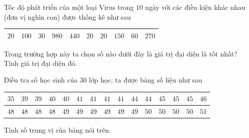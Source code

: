 \begin{bt}%
	 Tốc độ phát triển của một loại Virus trong $10$ ngày với các điều kiện khác nhau (đơn vị nghìn con) được thống kê như sau
	\begin{center}
		\begin{tabular}{|l|l|l|l|l|l|l|l|l|l|}
			 \hline $20$&$100$&$30$&$980$&$440$&$20$&$20$&$150$&$60$&$270$\\
			 \hline
		\end{tabular}
	\end{center}
	Trong  trường hợp này ta chọn số nào dưới đây là giá trị đại diện là tốt nhất? Tính giá trị đại diện đó.
\end{bt}

\begin{bt}%
	 Điều tra số học sinh của $30$ lớp học, ta được bảng số liệu như sau
	\begin{center}
		\begin{tabular}{|l|l|l|l|l|l|l|l|l|l|l|l|l|l|l|}
			 \hline $35$&$39$&$39$&$40$&$40$&$41$&$41$&$41$&$41$&$44$&$44$&$45$&$45$&$45$&$46$\\
			\hline  $48$&$48$&$48$&$48$&$49$&$49$&$49$&$49$&$49$&$49$&$50$&$50$&$50$&$50$&$51$\\
			 \hline
		\end{tabular}
	\end{center}
	 Tính số trung vị của bảng nói trên.
\end{bt}

